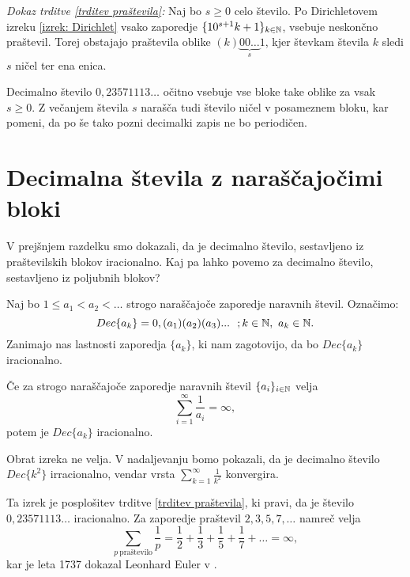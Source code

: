 \documentclass[twoside,11pt]{article}
\begin{document}
\noindent
{\em Dokaz trditve \ref{trditev praštevila}:\/} Naj bo $s \geq 0$ celo število. 
Po Dirichletovem izreku \ref{izrek: Dirichlet} vsako zaporedje
$ \{10^{s+1}k + 1\}_{k \in \mathbb{N}}$,  vsebuje neskončno praštevil. Torej obstajajo praštevila
oblike $(k)\underbrace{00 \dots}_{s}1$, kjer števkam števila $k$ sledi $s$ ničel ter ena enica. 

Decimalno število $0,23571113\dots$ očitno vsebuje vse bloke take oblike za vsak $s \geq 0$. Z večanjem števila
$s$ narašča tudi število ničel v posameznem bloku, kar pomeni, da po še tako pozni decimalki zapis ne bo periodičen.

\QED


\section{Decimalna števila z naraščajočimi bloki}

V prejšnjem razdelku smo dokazali, da je decimalno število, sestavljeno iz praštevilskih
blokov iracionalno. Kaj pa lahko povemo za decimalno število, sestavljeno iz poljubnih blokov?

Naj bo $1 \leq a_1 < a_2 < \dots $ strogo naraščajoče zaporedje naravnih števil. 
Označimo: \[Dec\{a_k\} = 0,(a_1)(a_2)(a_3)... \  \ ; k \in \mathbb{N}, \ a_k \in \mathbb{N} . \]
Zanimajo nas lastnosti zaporedja $\{a_k\}$, ki nam zagotovijo, da bo $Dec\{a_k\}$ iracionalno.

\begin{izrek}\label{irac1}
    
    Če za strogo naraščajoče zaporedje naravnih števil $\{a_i\}_{i \in \mathbb{N}}$ velja 
    \[ \sum_{i=1}^{\infty} \frac{1}{a_i} = \infty ,\]
    potem je $Dec\{a_k\}$ iracionalno.
\end{izrek}

\begin{opomba}
    Obrat izreka ne velja. V nadaljevanju bomo pokazali, da je decimalno število $Dec\{k^2\}$ irracionalno,
    vendar vrsta $\sum_{k=1}^{\infty}\frac{1}{k^2}$ konvergira.
\end{opomba}

Ta izrek je posplošitev trditve \ref{trditev praštevila}, ki pravi, da je število $0,23571113 \dots$
iracionalno. Za zaporedje praštevil $2, 3, 5, 7, \dots$ namreč velja
\[
    \sum_{p \ \text{praštevilo}}\frac{1}{p} = \frac{1}{2} + \frac{1}{3} + \frac{1}{5} + \frac{1}{7} + \dots = \infty ,\]
kar je leta 1737 dokazal Leonhard Euler v \cite{Eul}.
\end{document}
